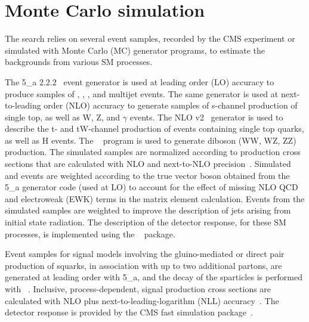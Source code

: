 
\clearpage
\section{Monte Carlo simulation}
\label{sec:simulation}

The search relies on several event samples, recorded by the CMS
experiment or simulated with Monte Carlo (MC) generator programs, to
estimate the backgrounds from various SM processes.

The {\MADGRAPH{}5\_a\MCATNLO} 2.2.2~\cite{Alwall2014} event generator
is used at leading order (LO) accuracy to produce samples of \wj, \zj,
\ttbar, and multijet events. The same generator is used at
next-to-leading order (NLO) accuracy to generate samples of s-channel
production of single top, as well as {\ttbar}W, {\ttbar}Z, and
{\ttbar}$\gamma$ events. The NLO \POWHEG v2~\cite{powheg,
  powheg_top_Wt} generator is used to describe the t- and tW-channel
production of events containing single top quarks, as well as
{\ttbar}H events. The ~\cite{pythia} program is used to
generate diboson (WW, WZ, ZZ) production. The simulated samples are
normalized according to production cross sections that are calculated
with NLO and next-to-NLO precision~\cite{Alwall2014, wphys, fewz,
  wwxs, top++, nlotop, powheg_top_Wt}. Simulated \wj and \zj events
are weighted according to the true vector boson \pt obtained from the
{\MADGRAPH{}5\_a\MCATNLO} generator code (used at LO) to account for
the effect of missing NLO QCD and electroweak (EWK) terms in the
matrix element calculation. Events from the \ttbar simulated samples
are weighted to improve the description of jets arising from initial
state radiation. The description of the detector response, for these
SM processes, is implemented using the \GEANTfour~\cite{geant}
package.

Event samples for signal models involving the gluino-mediated or
direct pair production of squarks, in association with up to two
additional partons, are generated at leading order with
{\MADGRAPH{}5\_a\MCATNLO}, and the decay of the sparticles is
performed with ~\cite{pythia}. Inclusive,
process-dependent, signal production cross sections are calculated
with NLO plus next-to-leading-logarithm (NLL)
accuracy~\cite{Beenakker:1996ch, PhysRevLett.102.111802,
  PhysRevD.80.095004, 1126-6708-2009-12-041,
  doi:10.1142/S0217751X11053560, susynlo}. The detector response is
provided by the CMS fast simulation package~\cite{fastsim}.

